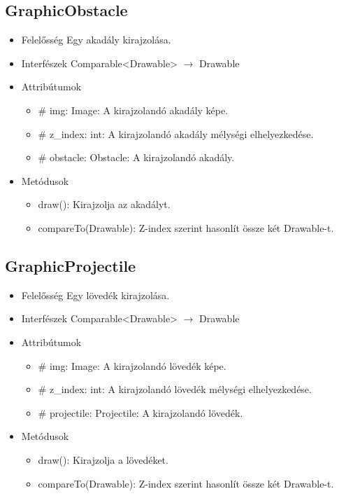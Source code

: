 \subsection{GraphicObstacle}
\begin{itemize}
\item Felelősség\newline
Egy akadály kirajzolása.
\item Interfészek\newline
Comparable<Drawable> $\rightarrow$ Drawable
\item Attribútumok\newline
	\begin{itemize}
		\item \# img: Image: A kirajzolandó akadály képe.
		\item \# z\_index: int: A kirajzolandó akadály mélységi elhelyezkedése.
		\item \# obstacle: Obstacle: A kirajzolandó akadály.
	\end{itemize}
\item Metódusok\newline
	\begin{itemize}
		\item draw(): Kirajzolja az akadályt.
		\item compareTo(Drawable): Z-index szerint hasonlít össze két Drawable-t.
	\end{itemize}
\end{itemize}

\subsection{GraphicProjectile}
\begin{itemize}
\item Felelősség\newline
Egy lövedék kirajzolása.
\item Interfészek\newline
Comparable<Drawable> $\rightarrow$ Drawable
\item Attribútumok\newline
	\begin{itemize}
		\item \# img: Image: A kirajzolandó lövedék képe.
		\item \# z\_index: int: A kirajzolandó lövedék mélységi elhelyezkedése.
		\item \# projectile: Projectile: A kirajzolandó lövedék.
	\end{itemize}
\item Metódusok\newline
	\begin{itemize}
		\item draw(): Kirajzolja a lövedéket.
		\item compareTo(Drawable): Z-index szerint hasonlít össze két Drawable-t.
	\end{itemize}
\end{itemize}

